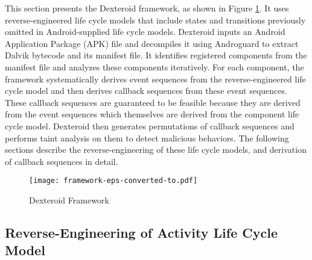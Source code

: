 \documentclass[10pt]{elsarticle}
\begin{document}
This section presents the Dexteroid framework, as shown in Figure \ref{framework}. It uses reverse-engineered life cycle models that include states and transitions previously omitted in Android-supplied life cycle models. Dexteroid inputs an Android Application Package (APK) file and decompiles it using Androguard \cite{Androguard} to extract Dalvik bytecode and its manifest file. It identifies registered components from the manifest file and analyzes these components iteratively. For each component, the framework systematically derives event sequences from the reverse-engineered life cycle model and then derives callback sequences from these event sequences. These callback sequences are guaranteed to be feasible because they are derived from the event sequences which themselves are derived from the component life cycle model. Dexteroid then generates permutations of callback sequences and performs taint analysis on them to detect malicious behaviors. The following sections describe the reverse-engineering of these life cycle models, and derivation of callback sequences in detail.

\begin{comment}
\begin{figure}[ht!]
\centering
\epsfig{file=framework.eps, width=120mm}
\caption{Dexteroid Framework}
\label{framework}
\end{figure}
\end{comment}

\begin{figure}[ht!]
\centering
\texttt{[image: framework-eps-converted-to.pdf]}
\caption{Dexteroid Framework}
\label{framework}
\end{figure}

\subsection {Reverse-Engineering of Activity Life Cycle Model}  \label{activityLCM}
\end{document}
